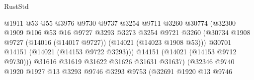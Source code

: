 \begin{lexlean}{RustStd}
\begin{coremodule}
                                            @1911
                                            @53
                                            @55
                                            @3976
                                            @9730
                                            @9737
                                            @3254
                                            @9711
                                            @3260
                                            @30774
                                            (@32300
                                              @1909
                                              @106
                                              @53
                                              @16
                                              @9727
                                              @3293
                                              @3273
                                              @3254
                                              @9721
                                              @3260
                                              (@30734
                                                @1908
                                                @9727
                                                (@14016 (@14017 @9727))
                                                (@14021 (@14023 @1908 @53)))
                                              @30701
                                              @14151
                                              (@14021 (@14153 @9722 @3293)))
                                            @14151
                                            (@14021 (@14153 @9712 @9730)))
                                          @31616
                                          @31619
                                          @31622
                                          @31626
                                          @31631
                                          @31637)
                                        (@32346
                                          @9740
                                          @1920
                                          @1927
                                          @13
                                          @3293
                                          @9746
                                          @3293
                                          @9753
                                          (@32691
                                            @1920
                                            @13
                                            @9746

\end{coremodule}
\end{lexlean}
